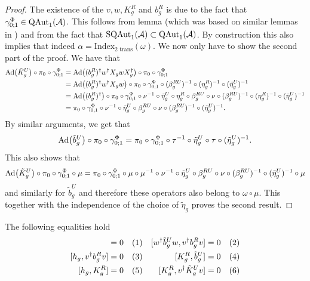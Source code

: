 \documentclass[11pt,a4paper,twoside]{article}
\def\version{1}
\newcommand{\versionDifference}[2]{\ifthenelse{\version=0}{#1}{#2}}
\numberwithin{equation}{section}
\begin{document}
	\begin{proof}
		The existence of the $v,w,K_g^R$ and $b_g^R$ is due to the fact that $\gamma^\Phi_{0;1}\in \QAut{\AA}$. This follows from lemma \versionDifference{\ref{lem:PropertiesLocallyGeneratedAutomorphisms}}{C.4. of \cite{jappens2023spt}} (which was based on similar lemmas in \cite{ogata2021h3gmathbb}) and from the fact that $\textrm{SQAut}_1(\AA)\subset \QAut{\AA}$. By construction this also implies that indeed $\alpha=\textrm{Index}_{\text{2 trans}}(\omega)$. We now only have to show the second part of the proof. We have that
		\begin{align}
			\Ad{\tilde{K}_g^U}\circ\pi_0\circ\gamma^\Phi_{0;1}&=\Ad{(b_g^R)^\dagger w^\dagger X_g w X_g^\dagger}\circ\pi_0\circ\gamma^\Phi_{0;1}\\
			&=\Ad{(b_g^R)^\dagger w^\dagger X_g w}\circ\pi_0\circ\gamma^\Phi_{0;1}\circ(\beta_g^{RU})^{-1}\circ(\eta_g^R)^{-1}\circ(\tilde{\eta}_g^U)^{-1}\\
			&=\Ad{(b_g^R)^\dagger}\circ\pi_0\circ\gamma^\Phi_{0;1}\circ\nu^{-1}\circ\tilde{\eta}_g^U\circ\eta_g^R\circ\beta_g^{RU}\circ\nu\circ(\beta_g^{RU})^{-1}\circ(\eta_g^R)^{-1}\circ(\tilde{\eta}_g^U)^{-1}\\
			&=\pi_0\circ\gamma^\Phi_{0;1}\circ\nu^{-1}\circ\tilde{\eta}_g^U\circ\beta_g^{RU}\circ\nu\circ(\beta_g^{RU})^{-1}\circ(\tilde{\eta}_g^U)^{-1}.
		\end{align}
		By similar arguments, we get that
		\begin{equation}
			\Ad{\tilde{b}_g^U}\circ\pi_0\circ\gamma^\Phi_{0;1}=\pi_0\circ\gamma^\Phi_{0;1}\circ\tau^{-1}\circ\tilde{\eta}_g^U\circ\tau\circ(\tilde{\eta}_g^U)^{-1}.
		\end{equation}
		This also shows that
		\begin{equation}
			\Ad{\tilde{K}_g^U}\circ\pi_0\circ\gamma^\Phi_{0;1}\circ\mu=\pi_0\circ\gamma^\Phi_{0;1}\circ\mu\circ\mu^{-1}\circ\nu^{-1}\circ\tilde{\eta}_g^U\circ\beta_g^{RU}\circ\nu\circ(\beta_g^{RU})^{-1}\circ(\tilde{\eta}_g^U)^{-1}\circ\mu
		\end{equation}
		and similarly for $\tilde{b}_g^U$ and therefore these operators also belong to $\omega\circ\mu$. This together with the independence of the choice of $\tilde{\eta}_g$ proves the second result.
	\end{proof}
	\begin{lemma}
		The following equalities hold
		\begin{align*}
			[h_g ,w^\dagger \tilde{b}_g^U w]&=0 \Label{eq:H^1IndexRotationInvariantCommutator1}& [w^\dagger \tilde{b}_g^U w,v^\dagger b_g^R v]&=0 \Label{eq:H^1IndexRotationInvariantCommutator4}\\
			[h_g, v^\dagger b_g^R v]&=0 \Label{eq:H^1IndexRotationInvariantCommutator2}& [K_g^R,\tilde{b}_g^U] &= 0 \Label{eq:H^1IndexRotationInvariantCommutator5}\\
			[h_g ,K_g^R]&=0 \Label{eq:H^1IndexRotationInvariantCommutator3}& [K_g^R,v^\dagger \tilde{K}^U_g v] &= 0 \Label{eq:H^1IndexRotationInvariantCommutator6}
		\end{align*}
	\end{lemma}
\end{document}

